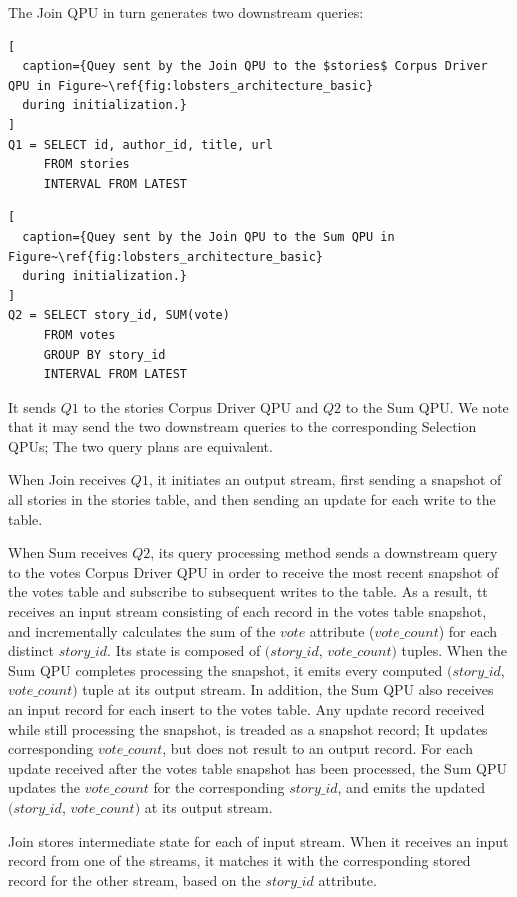 \noindent
The Join QPU in turn generates two downstream queries:

\begin{lstlisting}[
  caption={Quey sent by the Join QPU to the $stories$ Corpus Driver QPU in Figure~\ref{fig:lobsters_architecture_basic}
  during initialization.}
]
Q1 = SELECT id, author_id, title, url
     FROM stories
     INTERVAL FROM LATEST
\end{lstlisting}

\begin{lstlisting}[
  caption={Quey sent by the Join QPU to the Sum QPU in Figure~\ref{fig:lobsters_architecture_basic}
  during initialization.}
]
Q2 = SELECT story_id, SUM(vote)
     FROM votes
     GROUP BY story_id
     INTERVAL FROM LATEST
\end{lstlisting}

\noindent
It sends $Q1$ to the stories Corpus Driver QPU and $Q2$ to the Sum QPU.
We note that it may send the two downstream queries to the corresponding Selection QPUs;
The two query plans are equivalent.

When Join receives $Q1$, it initiates an output stream,
first sending a snapshot of all stories in the stories table,
and then sending an update for each write to the table.

When Sum receives $Q2$, its query processing method sends a downstream query to the votes Corpus Driver QPU
in order to receive the most recent snapshot of the votes table and subscribe to subsequent writes to the table.
As a result, tt receives an input stream consisting of each record in the votes table snapshot,
and incrementally calculates the sum of the $vote$ attribute ($vote\_count$) for each distinct $story\_id$.
Its state is composed of $(story\_id$, $vote\_count)$ tuples.
When the Sum QPU completes processing the snapshot, it emits every computed $(story\_id$, $vote\_count)$ tuple
at its output stream.
In addition, the Sum QPU also receives an input record for each insert to the votes table.
Any update record received while still processing the snapshot, is treaded as a snapshot record;
It updates corresponding $vote\_count$, but does not result to an output record.
For each update received after the votes table snapshot has been processed,
the Sum QPU updates the $vote\_count$ for the corresponding $story\_id$,
and emits the updated $(story\_id$, $vote\_count)$ at its output stream.

Join stores intermediate state for each of input stream.
When it receives an input record from one of the streams,
it matches it with the corresponding stored record for the other stream,
based on the $story\_id$ attribute.

